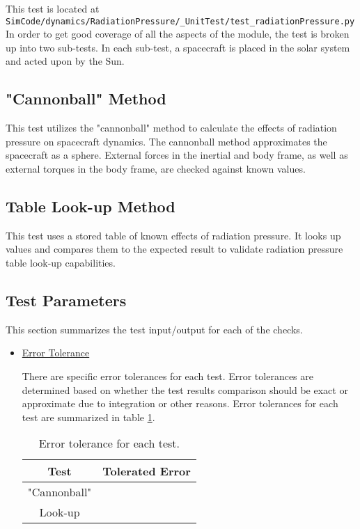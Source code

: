 \documentclass[]{BasiliskReportMemo}
\newcommand{\testname}{test\_radiationPressure.py }
\begin{document}
This test is located at {\tt SimCode/dynamics/RadiationPressure/\_UnitTest/\testname} In order to get good coverage of all the aspects of the module, the test is broken up into two sub-tests. In each sub-test, a spacecraft is placed in the solar system and acted upon by the Sun. \par

\subsection{"Cannonball" Method} This test utilizes the "cannonball" method to calculate the effects of radiation pressure on spacecraft dynamics. The cannonball method approximates the spacecraft as a sphere. External forces in the inertial and body frame, as well as external torques in the body frame, are checked against known values.
\subsection{Table Look-up Method} This test uses a stored table of known effects of radiation pressure. It looks up values and compares them to the expected result to validate radiation pressure table look-up capabilities.


\subsection{Test Parameters}

This section summarizes the test input/output for each of the checks. 
\begin{itemize}
\item \underline{Error Tolerance}

There are specific error tolerances for each test. Error tolerances are determined based on whether the test results comparison should be exact or approximate due to integration or other reasons. Error tolerances for each test are summarized in table \ref{tab:errortol}. 

\begin{table}[htbp]
	\caption{Error tolerance for each test.}
	\label{tab:errortol}
	\centering \fontsize{10}{10}\selectfont
	\begin{tabular}{ c | c } %
		\hline
		\textbf{Test}   							& \textbf{Tolerated Error} 						  \\ \hline
		"Cannonball" &		   \\ \hline
		Look-up					& 														   \\ \hline
	\end{tabular}
\end{table}
\end{itemize}
\end{document}
